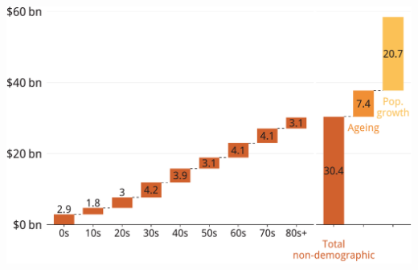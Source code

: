 \documentclass[tikz]{standalone}\usepackage[]{graphicx}\usepackage[]{color}
\newenvironment{knitrout}{}{} %
\begin{document}
\begin{knitrout}
\color{fgcolor}
\includegraphics[width=11.000in,height=7.00in]{./b5-figure/FISCAL-Figure13-1} 

\end{knitrout}
\end{document}
